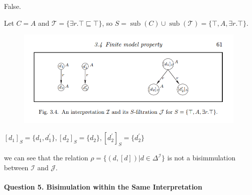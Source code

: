 \documentclass[12pt]{article}
\begin{document}
    False.\par
    Let $C = A$ and $\mathcal{T} = \{ \exists r.\top \sqsubseteq \top \}$, so $S = \operatorname{sub}(C) \cup \operatorname{sub}(\mathcal{T}) = \{ \top, A, \exists r.\top \}$.\par
    \begin{figure}[htbp]
		\centering 
		\includegraphics[width=1.0\textwidth,height=0.5\textwidth]{hw2_4.png}
	\end{figure} 
    $[d_1]_S=\{d_1, d_1^{'}\}, [d_2]_S=\{d_2\}, [d_2^{'}]_S=\{d_2^{'}\}$\par
    we can see that the relation $\rho = \{ (d, [d]) | d \in \Delta^{\mathcal{I}} \}$ is not a bisimmulation between $\mathcal{I}$ and $\mathcal{J}$.

    \paragraph{Question 5. Bisimulation within the Same Interpretation}~{}
    \\
\end{document}
